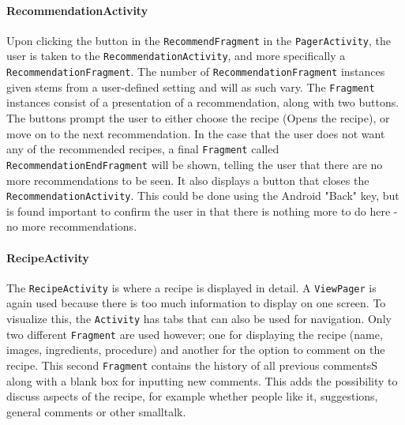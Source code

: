 \paragraph{RecommendationActivity}
Upon clicking the button in the \texttt{RecommendFragment} in the \texttt{PagerActivity}, the user is taken to the \texttt{RecommendationActivity}, and more specifically a \texttt{RecommendationFragment}. The number of \texttt{RecommendationFragment} instances given stems from a user-defined setting and will as such vary. The \texttt{Fragment} instances consist of a presentation of a recommendation, along with two buttons. The buttons prompt the user to either choose the recipe (Opens the recipe), or move on to the next recommendation. In the case that the user does not want any of the recommended recipes, a final \texttt{Fragment} called \texttt{RecommendationEndFragment} will be shown, telling the user that there are no more recommendations to be seen. It also displays a button that closes the \texttt{RecommendationActivity}. This could be done using the Android "Back" key, but is found important to confirm the user in that there is nothing more to do here - no more recommendations.

\paragraph{RecipeActivity}
The \texttt{RecipeActivity} is where a recipe is displayed in detail. A \texttt{ViewPager} is again used because there is too much information to display on one screen. To visualize this, the \texttt{Activity} has tabs that can also be used for navigation. Only two different \texttt{Fragment} are used however; one for displaying the recipe (name, images, ingredients, procedure) and another for the option to comment on the recipe. This second \texttt{Fragment} contains the history of all previous commentsS along with a blank box for inputting new comments. This adds the possibility to discuss aspects of the recipe, for example whether people like it, suggestions, general comments or other smalltalk.